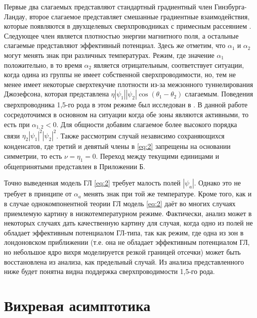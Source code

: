 Первые два слагаемых представляют стандартный градиентный член 
Гинзбурга-Ландау, второе слагаемое представляет смешанные градиентные 
взаимодействия, которые появляются в двухщелевых сверхпроводниках с примесным 
рассеянием \cite{bib:8,bib:9}. Следующее член является плотностью энергии 
магнитного поля, а остальные слагаемые представляют эффективный потенциал. 
Здесь же отметим, что \( \alpha_1 \) и \( \alpha_2 \) могут менять знак 
при различных температурах. Режим, где значение \( \alpha_1 \) положительно, 
в то время \( \alpha_2 \) является отрицательным, соответствует ситуации, 
когда одина из группы не имеет собственной сверхпроводимости, но, тем не менее 
имеет некоторые сверхтекучие плотности из-за межзонного туннелирования 
Джозефсона, которая представлена 
\( \eta|\psi_1||\psi_2|\cos(\theta_1-\theta_2) \) слагаемым. Поведения 
сверхпроводника 1,5-го рода в этом режиме был исследован в \cite{bib:2}. В 
данной работе сосредоточимся в основном на ситуации когда обе зоны являются 
активными, то есть при \( \alpha_{1,2} < 0 \). Для общности добавим слагаемое 
более высокого порядка связи \( \eta_2|\psi_1|^2|\psi_2|^2 \). Также 
рассмотрим случай независимо сохраняющихся конденсатов, где третий и девятый 
члены в \eqref{eq:2} запрещены на основании симметрии, то есть 
\( \nu = \eta_1 = 0 \). Переход между текущими единицами и общепринятыми 
представлен в Приложении Б.

Точно выведенная модель ГЛ \eqref{eq:2} требует малость полей \( |\psi_a| \). 
Однако это не требует в принципе от \( \alpha_a \) менять знак при той же 
температуре. Кроме того, как и в случае однокомпонентной теории ГЛ модель 
\eqref{eq:2} даёт во многих случаях приемлемую картину в низкотемпературном 
режиме. Фактически, анализ может в некоторых случаях дать качественную картину 
для случая, когда одно из полей не обладает эффективным потенциалом ГЛ-типа, 
так как режим, где одна из зон в лондоновском приближении (т.е. она не 
обладает эффективным потенциалом ГЛ, но небольшое ядро вихря моделируется 
резкой границей отсечки) может быть восстановлена из анализа, как предельный 
случай. Из анализа представленного ниже будет понятна видна поддержка 
сверхпроводимости 1,5-го рода.

\section{Вихревая асимптотика}

